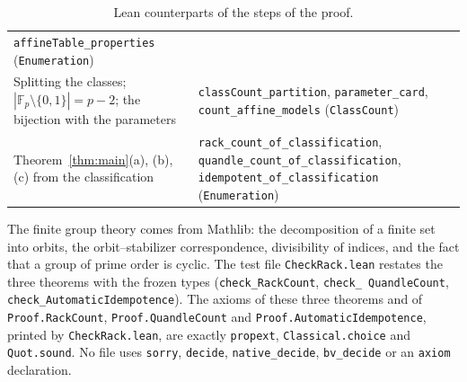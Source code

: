 \documentclass[11pt]{article}
\theoremstyle{definition}
\theoremstyle{remark}
\newcommand{\F}{\mathbb F}
\begin{document}
{\begin{table}[ht]
\begin{tabular}{@{}>{\raggedright\arraybackslash}p{}>{\raggedright\arraybackslash}p{}@{}}
\texttt{affineTable\_properties} (\texttt{Enumeration}) \\
Splitting the classes; $|\F_p\setminus\{0,1\}|=p-2$; the bijection with the
parameters & \texttt{classCount\_partition}, \texttt{parameter\_card},
\texttt{count\_affine\_models} (\texttt{ClassCount}) \\
Theorem~\ref{thm:main}(a), (b), (c) from the classification &
\texttt{rack\_count\_of\_classification},
\texttt{quandle\_count\_of\_classification},
\texttt{idempotent\_of\_classification} (\texttt{Enumeration}) \\
\hline
\end{tabular}
\caption{Lean counterparts of the steps of the proof.}
\label{tab:lean}
\end{table}

\noindent The finite group theory comes from Mathlib: the decomposition of a
finite set into orbits, the orbit--stabilizer correspondence, divisibility of
indices, and the fact that a group of prime order is cyclic. The test file
\texttt{CheckRack.lean} restates the three theorems with the frozen types
(\texttt{check\_\allowbreak RackCount}, \texttt{check\_\allowbreak
QuandleCount}, \texttt{check\_\allowbreak AutomaticIdempotence}). The axioms of
these three theorems and of \texttt{Proof.RackCount},
\texttt{Proof.QuandleCount} and \texttt{Proof.AutomaticIdempotence}, printed by
\texttt{CheckRack.lean}, are exactly \texttt{propext},
\texttt{Classical.choice} and \texttt{Quot.sound}. No file uses
\texttt{sorry}, \texttt{decide}, \texttt{native\_\allowbreak decide},
\texttt{bv\_\allowbreak decide} or an \texttt{axiom} declaration.

}
\end{document}
